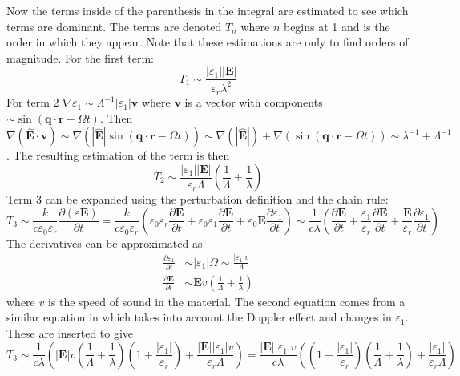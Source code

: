 \documentclass[10pt,a4paper]{eitExjobb}
\begin{document}
	Now the terms inside of the parenthesis in the integral are estimated to see which terms are dominant. The terms are denoted $T_n$ where $n$ begins at 1 and is the order in which they appear. Note that these estimations are only to find orders of magnitude. For the first term:
	\begin{equation*}
	T_1 \sim \frac{|\varepsilon_1| |\bm{E}|}{\varepsilon_r \lambda^2}
	\end{equation*}
	For term 2 $\nabla \varepsilon_1 \sim \Lambda^{-1} |\varepsilon_1| \bm{v}$ where $\bm{v}$ is a vector with components $\sim \sin(\bm{q} \cdot \bm{r} - \Omega t)$. Then $\nabla (\bm{\hat{E}} \cdot \bm{v}) \sim \nabla(|\bm{\hat{E}}| \sin(\bm{q} \cdot \bm{r} - \Omega t)) \sim \nabla(|\bm{\hat{E}}|) + \nabla(\sin(\bm{q} \cdot \bm{r} - \Omega t)) \sim \lambda^{-1} + \Lambda^{-1}$. The resulting estimation of the term is then
	\begin{equation*}
	T_2 \sim \frac{|\varepsilon_1| |\bm{E}|}{\varepsilon_r \Lambda} \left( \frac{1}{\Lambda} + \frac{1}{\lambda} \right)
	\end{equation*}
	Term 3 can be expanded using the perturbation definition and the chain rule:
	\begin{equation*}
	T_3 \sim \frac{k}{c\varepsilon_0\varepsilon_r} \frac{\partial (\varepsilon \bm{E})}{\partial t} = \frac{k}{c\varepsilon_0\varepsilon_r} \left( \varepsilon_0\varepsilon_r \frac{\partial \bm{E}}{\partial t} + \varepsilon_0\varepsilon_1 \frac{\partial \bm{E}}{\partial t} + \varepsilon_0\bm{E} \frac{\partial \varepsilon_1}{\partial t}\right)
	\sim \frac{1}{c\lambda} \left( \frac{\partial \bm{E}}{\partial t} + \frac{\varepsilon_1}{\varepsilon_r} \frac{\partial \bm{E}}{\partial t} + \frac{\bm{E}}{\varepsilon_r} \frac{\partial \varepsilon_1}{\partial t} \right)
	\end{equation*}
	The derivatives can be approximated as
	\begin{align*}
	\frac{\partial \varepsilon_1}{\partial t} &\sim |\varepsilon_1|\Omega \sim \frac{|\varepsilon_1| v}{\Lambda} \\
	\frac{\partial \bm{E}}{\partial t} &\sim \bm{E} v \left( \frac{1}{\Lambda} + \frac{1}{\lambda} \right)
	\end{align*}
	where $v$ is the speed of sound in the material. The second equation comes from a similar equation in \cite{Tatarskii1971} which takes into account the Doppler effect and changes in $\varepsilon_1$. These are inserted to give
	\begin{equation*}
	T_3 \sim \frac{1}{c\lambda} \left( |\bm{E}| v \left( \frac{1}{\Lambda} + \frac{1}{\lambda} \right) \left( 1 + \frac{|\varepsilon_1|}{\varepsilon_r} \right) + \frac{|\bm{E}| |\varepsilon_1| v}{\varepsilon_r \Lambda} \right) =
	\frac{|\bm{E}| |\varepsilon_1| v}{c\lambda} \left( \left( 1 + \frac{|\varepsilon_1|}{\varepsilon_r} \right) \left( \frac{1}{\Lambda} + \frac{1}{\lambda} \right) + \frac{|\varepsilon_1|}{\varepsilon_r \Lambda} \right)
	\end{equation*}
\end{document}
